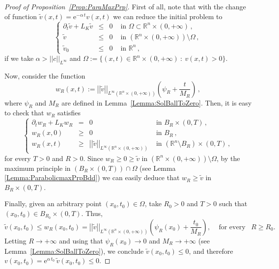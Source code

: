 \documentclass[12pt,reqno]{amsart}
\theoremstyle{definition}
\theoremstyle{remark}
\newcommand{\con}[1]{\mathbb{#1}}
\newcommand{\R}{\con{R}} %
\newcommand{\e}{\mathrm{e}}
\newcommand{\norm}[1]{\left | \left |{#1} \right | \right |}
\newcommand\beqc[1]{\left\{\begin{array}{#1}}
\newcommand\eeqc{\end{array} \right.}
\def\PDEsystem{rcll}
\numberwithin{equation}{section}
\begin{document}
\begin{proof}[Proof of Proposition~\ref{Prop:ParaMaxPrp}]
	First of all, note that with the change of function $\tilde{v}(x,t) = \e^{-\alpha\,t} v(x,t)$ we can reduce the initial problem to
	\begin{equation*}
	\beqc{\PDEsystem}
	\partial_t \tilde{v} + L_K  \tilde{v} &\leq& 0 & \textrm{ in } \Omega \subset\R^n\times(0,+\infty)\,,\\
	\tilde{v} &\leq& 0 & \textrm{ in }  \left(\R^n\times(0,+\infty)\right) \setminus  \Omega\,,\\
	\tilde{v}_0 &\leq& 0 & \textrm{ in } \R^n\,,
	\eeqc
	\end{equation*}
	if we take $\alpha > ||c||_{L^\infty}$ and $\Omega := \{(x,t)\in \R^n\times(0,+\infty) \ : \ v(x,t) > 0\}$.
	
	Now, consider the function 
	$$ 
	w_R(x,t) := \norm{\tilde{v} }_{L^\infty(\R^n \times (0,+\infty))} \left( \psi_R + \dfrac{t}{M_R} \right)\,,
	$$
	where $\psi_R$ and $M_R$ are defined in Lemma~\ref{Lemma:SolBallToZero}. Then, it is easy to check that $w_R$ satisfies
	\begin{equation*}
	\beqc{\PDEsystem}
	\partial_t w_R + L_K  w_R &=& 0 & \textrm{ in }B_R\times(0,T)\,,\\
	w_R(x,0) &\geq& 0 & \textrm{ in } B_R\,,\\
	w_R(x,t) &\geq& \norm{\tilde{v}}_{L^\infty(\R^n \times (0,+\infty))}  & \textrm{ in } \left( \R^n\setminus B_R\right) \times (0,T) \,,
	\eeqc
	\end{equation*}
	for every $T>0$ and $R>0$. Since $w_R \geq 0 \geq \tilde{v}$ in  $\left(\R^n\times(0,+\infty)\right)\setminus \Omega$, by the maximum principle in $(B_R\times (0,T))\cap \Omega$ (see Lemma \ref{Lemma:ParabolicmaxPrpBdd}) we can easily deduce that $ w_R\geq \tilde{v} $ in $B_R\times(0,T)$.
	
	Finally, given an arbitrary point $(x_0,t_0) \in \Omega$, take $R_0>0$ and $T>0$ such that $(x_0,t_0)\in B_{R_0}\times (0,T)$. Thus,
	$$ 
	\tilde{v}(x_0,t_0) \leq w_R(x_0,t_0) =  \norm{\tilde{v} }_{L^\infty(\R^n \times (0,+\infty))} \left( \psi_R (x_0) + \dfrac{t_0}{M_R} \right), \,\,\,\,\,\text{ for every }\,\,\, R\geq R_0.
	$$
	Letting $R \to +\infty$ and using that $\psi_R(x_0) \to 0$ and $M_R \to +\infty$ (see Lemma~\ref{Lemma:SolBallToZero}), we conclude $ \tilde{v}(x_0,t_0) \leq  0$, and therefore $ v(x_0,t_0) = \e^{\alpha\,t_0}\,\tilde{v}(x_0,t_0) \leq 0$.
\end{proof}

\end{document}
